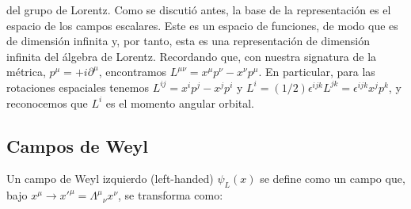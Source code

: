 \documentclass[a4paper,11pt]{book} %
\begin{document}
del grupo de Lorentz. 
\medskip\newline
Como se discutió antes, la base de la representación es el
espacio de los campos escalares. Este es un espacio de funciones, de modo que es
de dimensión infinita y, por tanto, esta es una representación de
dimensión infinita del álgebra de Lorentz. 
 \medskip\newline
Recordando que, con nuestra signatura de la métrica, $p^{\mu}=+i\partial^{\mu}$, encontramos $L^{\mu\nu}=x^{\mu}p^{\nu}-x^{\nu}p^{\mu}$. En
particular, para las rotaciones espaciales tenemos $L^{ij}=x^{i}p^{j}-x^{j}p^{i}$
y $L^{i}=(1/2)\epsilon^{ijk}L^{jk}=\epsilon^{ijk}x^{j}p^{k}$, y reconocemos que
$L^{i}$ es el momento angular orbital.
 
\subsection*{Campos de Weyl}
\noindent
Un campo de Weyl izquierdo (left-handed) $\psi_{L}(x)$ se define como un
campo que, bajo $x^{\mu}\rightarrow x'^{\mu}=\Lambda^{\mu}{}_{\nu}x^{\nu}$, se
transforma como:
 
\end{document}
